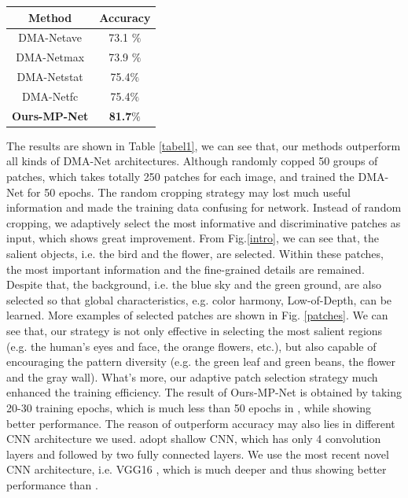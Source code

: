 \documentclass[10pt,twocolumn,letterpaper]{article}
\begin{document}
\begin{center}
	\begin{tabular}{||c|c||} 
		\hline
		Method & Accuracy \\
		\hline\hline
		DMA-Net{\tiny ave} & 73.1 $\%$ \\
		DMA-Net{\tiny max} & 73.9 $\%$ \\
		DMA-Net{\tiny stat} & 75.4$\% $ \\
		DMA-Net{\tiny fc} & 75.4$\% $ \\
		\hline
		\textbf{Ours-MP-Net} & \textbf{81.7$\% $}\\
		\hline
	\end{tabular} \label{tabel1} 
\end{center} 

The results are shown in Table \ref{tabel1}, we can see that, our methods outperform all kinds of DMA-Net architectures.
Although \cite{Lu:2015:ICCV} randomly copped 50 groups of patches, which takes totally 250 patches for each image, and trained the DMA-Net for 50 epochs. The random cropping strategy may lost much useful information and made the training data confusing for network. Instead of random cropping, we adaptively select the most informative and discriminative patches as input, which shows great improvement. From Fig.\ref{intro}, we can see that, the salient objects, i.e. the bird and the flower, are selected. Within these patches, the most important information and the fine-grained details are remained. Despite that, the background, i.e. the blue sky and the green ground, are also selected so that global characteristics, e.g. color harmony, Low-of-Depth, can be learned. More examples of selected patches are shown in Fig. \ref{patches}. We can see that, our strategy is not only effective in selecting the most salient regions (e.g. the human's eyes and face, the orange flowers, etc.), but also capable of encouraging the pattern diversity (e.g. the green leaf and green beans, the flower and the gray wall).
What's more, our adaptive patch selection strategy much enhanced the training efficiency. The result of Ours-MP-Net is obtained by taking 20-30 training epochs, which is much less than 50 epochs in \cite{Lu:2015:ICCV}, while showing better performance.
The reason of outperform accuracy may also lies in different CNN architecture we used. \cite{Lu:2015:ICCV} adopt shallow CNN, which has only 4 convolution layers and followed by two fully connected layers. We use the most recent novel CNN architecture, i.e. VGG16 \cite{Simonyan14c:2014:VGG}, which is much deeper and thus showing better performance than \cite{Lu:2015:ICCV}.
\end{document}
